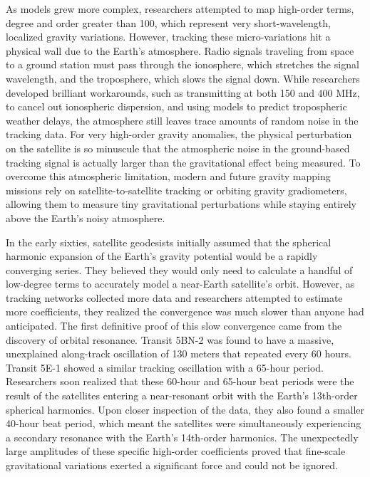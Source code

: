 As models grew more complex, researchers attempted to map high-order terms, degree and order greater than 100, which represent very short-wavelength, localized gravity variations. However, tracking these micro-variations hit a physical wall due to the Earth's atmosphere. Radio signals traveling from space to a ground station must pass through the ionosphere, which stretches the signal wavelength, and the troposphere, which slows the signal down. While researchers developed brilliant workarounds, such as transmitting at both 150 and 400 MHz, to cancel out ionospheric dispersion, and using models to predict tropospheric weather delays, the atmosphere still leaves trace amounts of random noise in the tracking data. For very high-order gravity anomalies, the physical perturbation on the satellite is so minuscule that the atmospheric noise in the ground-based tracking signal is actually larger than the gravitational effect being measured. To overcome this atmospheric limitation, modern and future gravity mapping missions rely on satellite-to-satellite tracking or orbiting gravity gradiometers, allowing them to measure tiny gravitational perturbations while staying entirely above the Earth's noisy atmosphere.

In the early sixties, satellite geodesists initially assumed that the spherical harmonic expansion of the Earth's gravity potential would be a rapidly converging series. They believed they would only need to calculate a handful of low-degree terms to accurately model a near-Earth satellite's orbit. However, as tracking networks collected more data and researchers attempted to estimate more coefficients, they realized the convergence was much slower than anyone had anticipated. The first definitive proof of this slow convergence came from the discovery of orbital resonance. Transit 5BN-2 was found to have a massive, unexplained along-track oscillation of 130 meters that repeated every 60 hours. Transit 5E-1 showed a similar tracking oscillation with a 65-hour period. Researchers soon realized that these 60-hour and 65-hour beat periods were the result of the satellites entering a near-resonant orbit with the Earth's 13th-order spherical harmonics. Upon closer inspection of the data, they also found a smaller 40-hour beat period, which meant the satellites were simultaneously experiencing a secondary resonance with the Earth's 14th-order harmonics. The unexpectedly large amplitudes of these specific high-order coefficients proved that fine-scale gravitational variations exerted a significant force and could not be ignored. 

